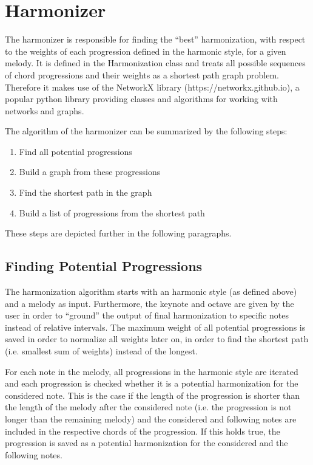 \section{Harmonizer}
The harmonizer is responsible for finding the ``best'' harmonization, with respect to the weights of each progression defined in the harmonic style, for a given melody. It is defined in the Harmonization class and treats all possible sequences of chord progressions and their weights as a shortest path graph problem. Therefore it makes use of the NetworkX library (https://networkx.github.io), a popular python library providing classes and algorithms for working with networks and graphs. 

The algorithm of the harmonizer can be summarized by the following steps:
\begin{enumerate}
  \item Find all potential progressions
  \item Build a graph from these progressions
  \item Find the shortest path in the graph
  \item Build a list of progressions from the shortest path
\end{enumerate}
These steps are depicted further in the following paragraphs.

\subsection{Finding Potential Progressions}
The harmonization algorithm starts with an harmonic style (as defined above) and a melody as input. Furthermore, the keynote and octave are given by the user in order to ``ground'' the output of final harmonization to specific notes instead of relative intervals. The maximum weight of all potential progressions is saved in order to normalize all weights later on, in order to find the shortest path (i.e. smallest sum of weights) instead of the longest.

For each note in the melody, all progressions in the harmonic style are iterated and each progression is checked whether it is a potential harmonization for the considered note. This is the case if the length of the progression is shorter than the length of the melody after the considered note (i.e. the progression is not longer than the remaining melody) and the considered and following notes are included in the respective chords of the progression. If this holds true, the progression is saved as a potential harmonization for the considered and the following notes.

